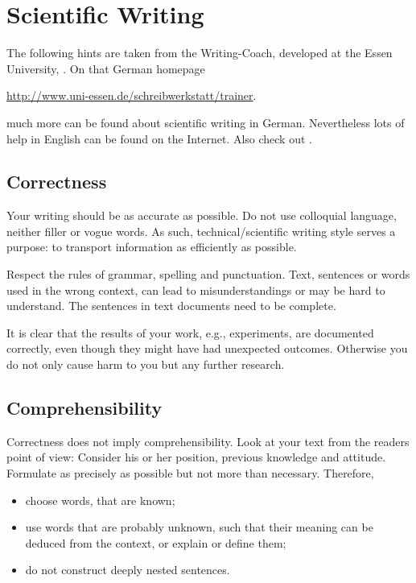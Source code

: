 \section{Scientific Writing}	\label{a:stil_en}

The following hints are taken from the Writing-Coach, developed at the Essen University, \cite{BuBiPo00}. On that German homepage
\begin{center}
\href{http://www.uni-essen.de/schreibwerkstatt/trainer}
{http://www.uni-essen.de/schreibwerkstatt/trainer}.
\end{center} 
much more can be found about scientific writing in German. Nevertheless lots of help in English can be found on the Internet.
Also check out \cite{Fe13}.


\subsection{Correctness}

Your writing should be as accurate as possible. Do not use colloquial language, neither filler or vogue words.
As such, technical/scientific writing style serves a purpose: to transport information as efficiently as possible.

Respect the rules of grammar, spelling and punctuation. Text, sentences or words used in the wrong context, can 
lead to misunderstandings or may be hard to understand. The sentences in text documents need to be complete.

It is clear that the results of your work, e.g., experiments, are documented correctly, even though they might have had unexpected outcomes.
Otherwise you do not only cause harm to you but any further research. 


\subsection{Comprehensibility}

Correctness does not imply comprehensibility. Look at your text from the readers point of view: Consider his or her position, previous knowledge
and attitude. Formulate as precisely as possible but not more than necessary. Therefore, 
\begin{itemize}
    \item choose words, that are known;
    \item use words that are probably unknown, such that their meaning can be deduced from the context, or explain or define them;
    \item do not construct deeply nested sentences.
\end{itemize}


